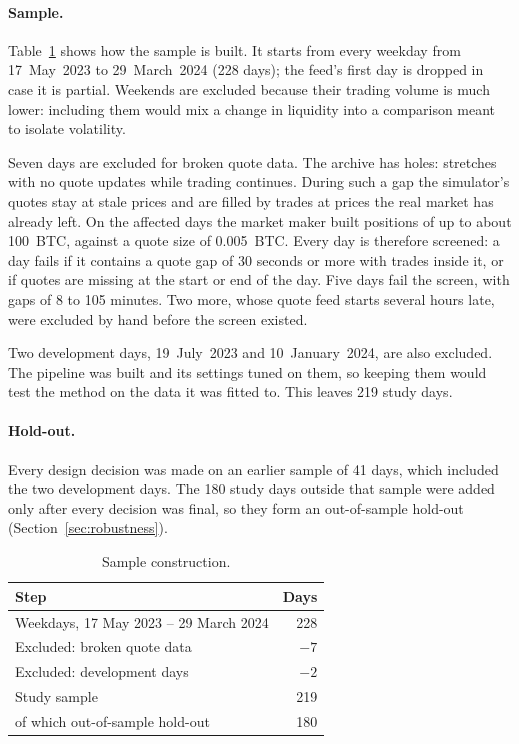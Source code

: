 \documentclass[11pt]{article}
\begin{document}
\paragraph{Sample.}
Table~\ref{tab:sample} shows how the sample is built. It starts from every weekday from 17~May~2023 to
29~March~2024 (228 days); the feed's first day is dropped in case it is partial. Weekends are excluded
because their trading volume is much lower: including them would mix a change in liquidity into a
comparison meant to isolate volatility.

Seven days are excluded for broken quote data. The archive has holes: stretches with no quote updates
while trading continues. During such a gap the simulator's quotes stay at stale prices and are filled by
trades at prices the real market has already left. On the affected days the market maker built positions
of up to about 100~BTC, against a quote size of 0.005~BTC. Every day is therefore screened: a day fails if
it contains a quote gap of 30 seconds or more with trades inside it, or if quotes are missing at the start
or end of the day. Five days fail the screen, with gaps of 8 to 105 minutes. Two more, whose quote feed
starts several hours late, were excluded by hand before the screen existed.

Two development days, 19~July~2023 and 10~January~2024, are also excluded. The pipeline was built and its
settings tuned on them, so keeping them would test the method on the data it was fitted to. This leaves
219 study days.

\paragraph{Hold-out.}
Every design decision was made on an earlier sample of 41 days, which included the two development days.
The 180 study days outside that sample were added only after every decision was final, so they form an
out-of-sample hold-out (Section~\ref{sec:robustness}).

\begin{table}[ht]
  \centering
  \caption{Sample construction.}
  \label{tab:sample}
  \begin{tabular}{lr}
    \toprule
    Step & Days \\
    \midrule
    Weekdays, 17 May 2023 -- 29 March 2024 & 228 \\
    Excluded: broken quote data & $-7$ \\
    Excluded: development days & $-2$ \\
    \midrule
    Study sample & 219 \\
    \quad of which out-of-sample hold-out & 180 \\
    \bottomrule
  \end{tabular}
\end{table}
\end{document}
